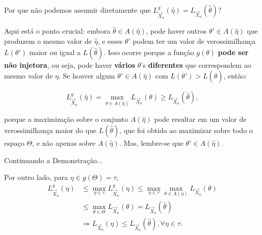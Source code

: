 \documentclass[12pt]{beamer}
\begin{document}
\begin{frame}{Por que não podemos assumir diretamente que \( L_{\vec{X}_n}^{g}(\hat{\eta}) = L_{\vec{X}_n}(\hat{\theta}) \)?}
	\begin{block}{}
		\justifying
		Aqui está o ponto crucial: embora \( \hat{\theta} \in A(\hat{\eta}) \), pode haver outros \( \theta' \in A(\hat{\eta}) \) que produzem o mesmo valor de \( \hat{\eta} \), e esses \( \theta' \) podem ter um valor de verossimilhança \( L(\theta') \) maior ou igual a \( L(\hat{\theta}) \). Isso ocorre porque a função \( g(\theta) \) \textbf{pode ser não injetora}, ou seja, pode haver \textbf{vários} \( \theta \)'s \textbf{diferentes} que correspondem ao mesmo valor de \( \eta \). Se houver algum \( \theta' \in A(\hat{\eta}) \) com \( L(\theta') > L(\hat{\theta}) \), então:
		
		\[
		L_{\vec{X}_n}^{g}(\hat{\eta}) = \max_{\theta \in A(\hat{\eta})} L_{\vec{X}_n}(\theta) \geq L_{\vec{X}_n}(\hat{\theta}),
		\]
		
		porque a maximização sobre o conjunto \( A(\hat{\eta}) \) pode resultar em um valor de verossimilhança maior do que \( L(\hat{\theta}) \), que foi obtido ao maximizar sobre todo o espaço \( \Theta \), e não apenas sobre \( A(\hat{\eta}) \). Mas, lembre-se que \( \theta' \in A(\hat{\eta}) \).
		
	\end{block}
\end{frame}

\begin{frame}{Continuando a Demonstração$\ldots$}
	\begin{block}{}
		\justifying
		Por outro lado, para $\eta\in g(\Theta)=\tau,$
		\begin{align*}
			L_{\vec{X}_{n}}^{g}(\eta)&\leq {\displaystyle \max_{\eta\in \tau}L_{\vec{X}_{n}}^{g}(\eta)}\leq \max_{\eta\in\tau}\max_{\theta\in A(\eta)}L_{\vec{X}_{n}}(\theta)\\
			&\leq \max_{\theta\in \Theta}L_{\vec{X}_{n}}(\theta)=L_{\vec{X}_{n}}(\hat{\theta})\\
			&\Rightarrow L_{\vec{X}_{n}}(\eta)\leq L_{\vec{X}_{n}}(\hat{\theta}), \forall \eta\in\tau.
		\end{align*}
	\end{block}
\end{frame}
\end{document}
